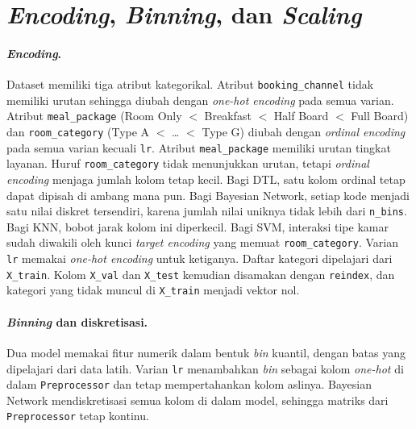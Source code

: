 \section{\textit{Encoding}, \textit{Binning}, dan \textit{Scaling}}

\paragraph{\textit{Encoding}.} Dataset memiliki tiga atribut kategorikal. Atribut
\texttt{booking\_channel} tidak memiliki urutan sehingga diubah dengan
\textit{one-hot encoding} pada semua varian. Atribut \texttt{meal\_package}
(Room Only $<$ Breakfast $<$ Half Board $<$ Full Board) dan
\texttt{room\_category} (Type A $<$ \dots{} $<$ Type G) diubah dengan
\textit{ordinal encoding} pada semua varian kecuali \texttt{lr}. Atribut
\texttt{meal\_package} memiliki urutan tingkat layanan. Huruf
\texttt{room\_category} tidak menunjukkan urutan, tetapi \textit{ordinal encoding}
menjaga jumlah kolom tetap kecil. Bagi DTL, satu kolom ordinal tetap dapat
dipisah di ambang mana pun. Bagi Bayesian Network, setiap kode menjadi satu nilai
diskret tersendiri, karena jumlah nilai uniknya tidak lebih dari \texttt{n\_bins}.
Bagi KNN, bobot jarak kolom ini diperkecil. Bagi SVM, interaksi tipe kamar sudah
diwakili oleh kunci \textit{target encoding} yang memuat \texttt{room\_category}.
Varian \texttt{lr} memakai \textit{one-hot encoding} untuk ketiganya. Daftar
kategori dipelajari dari \texttt{X\_train}. Kolom \texttt{X\_val} dan
\texttt{X\_test} kemudian disamakan dengan \texttt{reindex}, dan kategori yang
tidak muncul di \texttt{X\_train} menjadi vektor nol.

\paragraph{\textit{Binning} dan diskretisasi.} Dua model memakai fitur numerik
dalam bentuk \textit{bin} kuantil, dengan batas yang dipelajari dari data latih.
Varian \texttt{lr} menambahkan \textit{bin} sebagai kolom \textit{one-hot} di
dalam \texttt{Preprocessor} dan tetap mempertahankan kolom aslinya. Bayesian
Network mendiskretisasi semua kolom di dalam model, sehingga matriks dari
\texttt{Preprocessor} tetap kontinu.

